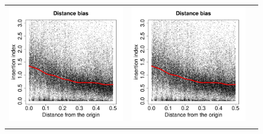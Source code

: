 \documentclass[a4paper,10pt, twocolumn]{article}
\begin{document}
\begin{figure}
\begin{tabular}{c c c}
\includegraphics[page=12, scale=0.22]{biases.pdf} &
\includegraphics[page=13, scale=0.22]{biases.pdf} \\
& 

\end{tabular}
\end{figure}
\end{document}
